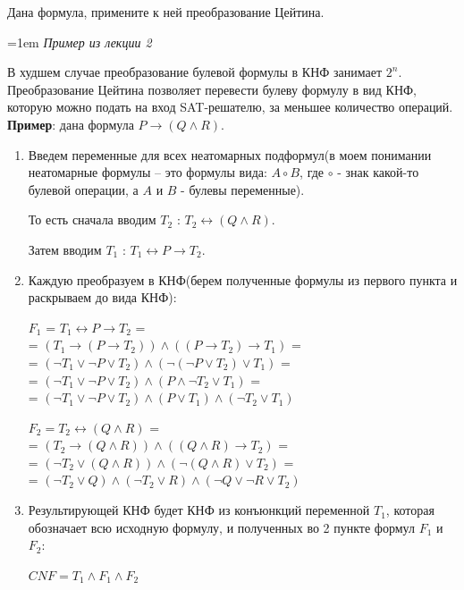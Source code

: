 \documentclass[12pt]{extreport}
\theoremstyle{definiton}
\theoremstyle{definition}
\theoremstyle{definition}
\newcommand{\solution}[2][\color{myblue}Ответ]{
\medskip
	\noindent{\bfseries #1 }{{\color{myblue}\bfseries #2:}}
}
\newenvironment{blockquote}{%
  \par%
  \medskip
  \leftskip=1em%
  \noindent}{%
  \par\medskip}
\begin{document}
\Pr[\textcolor{mygreen}{Алтана, DONE}] Дана формула, примените к ней преобразование Цейтина.

\solution{5}
\begin{blockquote}
\textcolor{mypurpur}{\textit{Пример из лекции 2}}\\
{\color{myblue}
\noindent В худшем случае преобразование булевой формулы в КНФ занимает $2^n$. Преобразование Цейтина позволяет перевести булеву формулу в вид КНФ, которую можно подать на вход SAT-решателю, за меньшее количество операций. \\

\textbf{Пример}: дана формула $P \rightarrow (Q \wedge R)$.

\begin{enumerate}
    \item Введем переменные для всех неатомарных подформул(в моем понимании неатомарные формулы -- это формулы вида: $A \circ B$, где $\circ$ - знак какой-то булевой операции, а $A$ и $B$ - булевы переменные).
    
    То есть сначала вводим  $T_2$ : $T_2 \leftrightarrow (Q \wedge R)$.
    
    Затем вводим $T_1$ : $T_1 \leftrightarrow P \rightarrow T_2$.
    \item Каждую преобразуем в КНФ(берем полученные формулы из первого пункта и раскрываем до вида КНФ): 
    
    $F_1$ = $T_1 \leftrightarrow P \rightarrow T_2$ = \\
    = $(T_1 \rightarrow (P \rightarrow T_2))\wedge((P \rightarrow T_2) \rightarrow T_1)$ = \\ 
    = $(\neg T_1 \vee \neg P \vee T_2)\wedge(\neg(\neg P \vee T_2) \vee T_1)$ = \\
    = $(\neg T_1 \vee \neg P \vee T_2)\wedge(P \wedge \neg T_2 \vee T_1)$ = \\
    = $(\neg T_1 \vee \neg P \vee T_2) \wedge (P \vee T_1) \wedge (\neg T_2 \vee T_1)$
    
    $F_2 = T_2 \leftrightarrow (Q \wedge R)$ = \\
    = $(T_2 \rightarrow (Q \wedge R))\wedge((Q \wedge R) \rightarrow T_2)$ =\\ 
    = $(\neg T_2 \vee (Q \wedge R))\wedge(\neg (Q \wedge R) \vee T_2)$ = \\
    = $(\neg T_2 \vee Q) \wedge (\neg T_2 \vee R) \wedge (\neg Q \vee \neg R \vee T_2)$
    
    \item Результирующей КНФ будет КНФ из конъюнкций переменной $T_1$, которая обозначает всю исходную формулу, и полученных во 2 пункте формул $F_1$ и $F_2$:
    
    $CNF = T_1 \wedge F_1 \wedge F_2$
    
\end{enumerate}
}
\end{blockquote}
\end{document}
